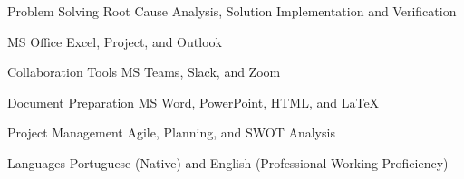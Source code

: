 


\begin{cvskills}


\cvskill
{Problem Solving} %
{Root Cause Analysis, Solution Implementation and Verification} %


\cvskill
{MS Office} %
{Excel, Project, and Outlook} %


\cvskill
{Collaboration Tools} %
{MS Teams, Slack, and Zoom} %


\cvskill
{Document Preparation} %
{MS Word, PowerPoint, HTML, and LaTeX } %


\cvskill
{Project Management} %
{Agile, Planning, and SWOT Analysis} %


\cvskill
{Languages} %
{ Portuguese (Native) and English (Professional Working Proficiency)} %


\end{cvskills}
